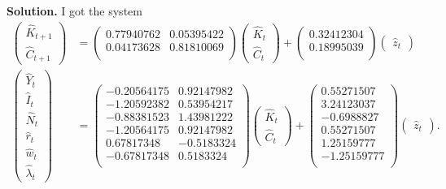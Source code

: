 \documentclass[11pt]{article}
\numberwithin{equation}{section} %
\numberwithin{figure}{section} %
\numberwithin{table}{section} %
\theoremstyle{definition}
\newenvironment{solution}{\begin{addmargin}[2em]{0em} {\bf Solution. }}{\end{addmargin}}
\begin{document}
\begin{solution}
    I got the system
    \begin{align*}
        \begin{pmatrix}
            \hat{K}_{t+1} \\
            \hat{C}_{t+1}
        \end{pmatrix} &= \begin{pmatrix}
            0.77940762 & 0.05395422\\
            0.04173628 & 0.81810069\\
          \end{pmatrix} \begin{pmatrix}
            \hat{K}_t \\
            \hat{C}_t
        \end{pmatrix} + \begin{pmatrix}
            0.32412304\\
            0.18995039\\
          \end{pmatrix} \begin{pmatrix}
            \hat{z}_t
        \end{pmatrix} \\
        \begin{pmatrix}
            \hat{Y}_t \\
            \hat{I}_t \\
            \hat{N}_t \\
            \hat{r}_t \\
            \hat{w}_t \\
            \hat{\lambda}_t
        \end{pmatrix} &= \begin{pmatrix}
            -0.20564175 & 0.92147982\\
            -1.20592382 & 0.53954217\\
            -0.88381523 & 1.43981222\\
            -1.20564175 & 0.92147982\\
            0.67817348 & -0.5183324\\
            -0.67817348 & 0.5183324\\
          \end{pmatrix} \begin{pmatrix}
            \hat{K}_t \\
            \hat{C}_t
        \end{pmatrix} + \begin{pmatrix}
            0.55271507\\
            3.24123037\\
            -0.6988827\\
            0.55271507\\
            1.25159777\\
            -1.25159777\\
          \end{pmatrix} \begin{pmatrix}
            \hat{z}_t
        \end{pmatrix}.
    \end{align*}


\end{solution}
\end{document}
